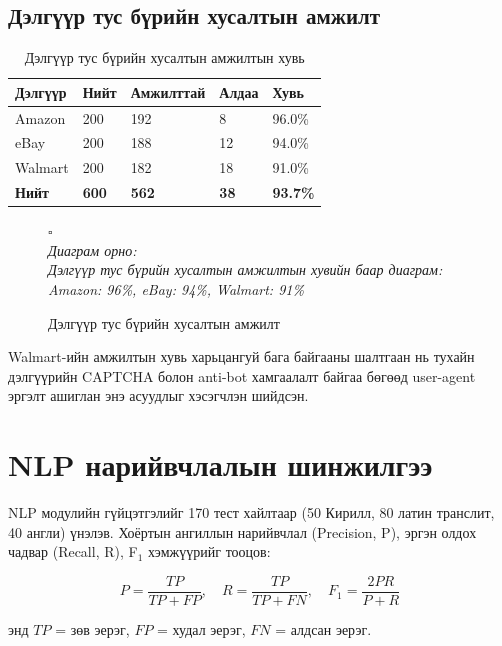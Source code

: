 \documentclass[12pt,a4paper]{report}
\newcommand{\figplaceholder}[2][7cm]{%
  \vspace{8pt}
  \begin{center}
    \colorbox{placeholderbg}{%
      \parbox[c][#1][c]{0.85\textwidth}{\centering
        {\color{darkgray!60}\Large $\square$}\\[8pt]
        {\color{darkgray}\itshape\small Диаграм орно:\\[4pt] #2}}}
  \end{center}
  \vspace{8pt}}
\begin{document}
\subsection{Дэлгүүр тус бүрийн хусалтын амжилт}

\begin{table}[H]
\centering
\caption{Дэлгүүр тус бүрийн хусалтын амжилтын хувь}
\label{tab:store_success}
\begin{tabularx}{\textwidth}{@{}lXXXX@{}}
\toprule
\textbf{Дэлгүүр} & \textbf{Нийт} & \textbf{Амжилттай} & \textbf{Алдаа} & \textbf{Хувь} \\
\midrule
Amazon  & 200 & 192 & 8  & 96.0\% \\
eBay    & 200 & 188 & 12 & 94.0\% \\
Walmart & 200 & 182 & 18 & 91.0\% \\
\textbf{Нийт} & \textbf{600} & \textbf{562} & \textbf{38} & \textbf{93.7\%} \\
\bottomrule
\end{tabularx}
\end{table}

\begin{figure}[H]
  \centering
  \figplaceholder[8cm]{Дэлгүүр тус бүрийн хусалтын амжилтын хувийн баар диаграм:\\ Amazon: 96\%, eBay: 94\%, Walmart: 91\%}
  \caption{Дэлгүүр тус бүрийн хусалтын амжилт}
  \label{fig:store_success}
\end{figure}

Walmart-ийн амжилтын хувь харьцангуй бага байгааны шалтгаан нь тухайн дэлгүүрийн CAPTCHA болон anti-bot хамгаалалт байгаа бөгөөд user-agent эргэлт ашиглан энэ асуудлыг хэсэгчлэн шийдсэн.

\section{NLP нарийвчлалын шинжилгээ}

NLP модулийн гүйцэтгэлийг 170 тест хайлтаар (50 Кирилл, 80 латин транслит, 40 англи) үнэлэв. Хоёртын ангиллын нарийвчлал (Precision, P), эргэн олдох чадвар (Recall, R), F$_1$ хэмжүүрийг тооцов:

\begin{equation}
P = \frac{TP}{TP + FP}, \quad R = \frac{TP}{TP + FN}, \quad
F_1 = \frac{2PR}{P + R}
\label{eq:prf}
\end{equation}

\noindent энд $TP$ = зөв эерэг, $FP$ = худал эерэг, $FN$ = алдсан эерэг.
\end{document}
